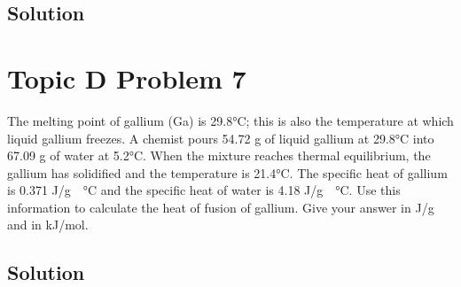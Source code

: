 \documentclass[10pt]{article}
\begin{document}
        \subsection{Solution}

    \pagebreak
    \section{Topic D Problem 7}
        The melting point of gallium (Ga) is 29.8\unit{\celsius}; this is also the temperature at which liquid gallium freezes. 
        A chemist pours 54.72 g of liquid gallium at 29.8\unit{\celsius} into 67.09 g of water at 5.2\unit{\celsius}. 
        When the mixture reaches thermal equilibrium, the gallium has solidified and the temperature is 21.4\unit{\celsius}. 
        The specific heat of gallium is 0.371 \unit{\joule/\gram\cdot\celsius} and the specific heat of water is 4.18 \unit{\joule/\gram\cdot\celsius}. 
        Use this information to calculate the heat of fusion of gallium. 
        Give your answer in J/g and in kJ/mol.

        \subsection{Solution}
    
    \pagebreak
    \tableofcontents
\end{document}
